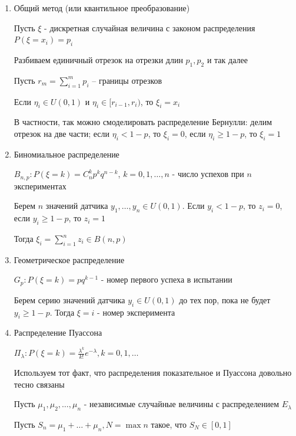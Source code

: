 \documentclass[12pt]{article}
\begin{document}
\begin{enumerate}
    \begin{enumerate}[label*=\Roman*. ]
        \item Общий метод (или квантильное преобразование)

        Пусть $\xi$ - дискретная случайная величина с законом распределения $P(\xi = x_i) = p_i$

        Разбиваем единичный отрезок на отрезки длин $p_1, p_2$ и так далее

        Пусть $r_m = \sum_{i = 1}^m p_i$ -- границы отрезков

        Если $\eta_i \in U(0, 1)$ и $\eta_i \in [r_{i-1}, r_{i})$, то $\xi_i = x_i$

        В частности, так можно смоделировать распределение Бернулли: делим отрезок на две части; если $\eta_i < 1 - p$, то $\xi_i = 0$, если $\eta_i \geq 1 - p$, то $\xi_i = 1$

        \item Биномиальное распределение

        $B_{n,p}: P(\xi = k) = C_n^k p^k q^{n - k}$, $k = 0, 1, \dots, n$ - число успехов при $n$ экспериментах
        
        Берем $n$ значений датчика $y_1, \dots, y_n \in U(0, 1)$. Если $y_i < 1 - p$, то $z_i = 0$, если $y_i \geq 1 - p$, то $z_i = 1$

        Тогда $\xi_i = \sum_{i = 1}^n z_i \in B(n, p)$

        \item Геометрическое распределение

        $G_p: P(\xi = k) = p q^{k - 1}$ - номер первого успеха в испытании

        Берем серию значений датчика $y_i \in U(0, 1)$ до тех пор, пока не будет $y_i \geq 1 - p$. Тогда $\xi = i$ - номер эксперимента

        \item Распределение Пуассона

        $\Pi_\lambda: P(\xi = k) = \frac{\lambda^k}{k!} e^{-\lambda}, k = 0, 1, \dots$

        Используем тот факт, что распределения показательное и Пуассона довольно тесно связаны

        \begin{MyTheorem}
            \Ths Пусть $\mu_1, \mu_2, \dots, \mu_n$ - независимые случайные величины с распределением $E_\lambda$

            Пусть $S_n = \mu_1 + \dots + \mu_n, N = \max n$ такое, что $S_N \in [0, 1]$


\end{MyTheorem}
\end{enumerate}
\end{enumerate}
\end{document}

